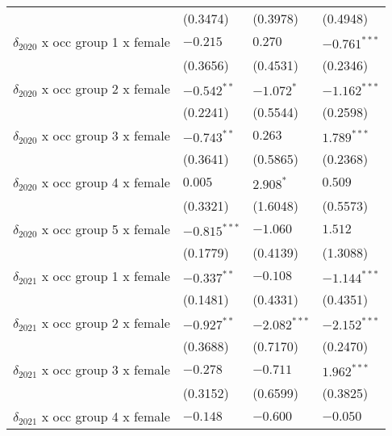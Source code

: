 \begin{tabular}{llll}
                                         &           (0.3474) &           (0.3978) &           (0.4948) \\
$\delta_{2020}$ x occ group 1 x female   &           $-0.215$ &            $0.270$ &     $-0.761^{***}$ \\
                                         &           (0.3656) &           (0.4531) &           (0.2346) \\
$\delta_{2020}$ x occ group 2 x female   &      $-0.542^{**}$ &         $-1.072^*$ &     $-1.162^{***}$ \\
                                         &           (0.2241) &           (0.5544) &           (0.2598) \\
$\delta_{2020}$ x occ group 3 x female   &      $-0.743^{**}$ &            $0.263$ &      $1.789^{***}$ \\
                                         &           (0.3641) &           (0.5865) &           (0.2368) \\
$\delta_{2020}$ x occ group 4 x female   &            $0.005$ &          $2.908^*$ &            $0.509$ \\
                                         &           (0.3321) &           (1.6048) &           (0.5573) \\
$\delta_{2020}$ x occ group 5 x female   &     $-0.815^{***}$ &           $-1.060$ &            $1.512$ \\
                                         &           (0.1779) &           (0.4139) &           (1.3088) \\
$\delta_{2021}$ x occ group 1 x female   &      $-0.337^{**}$ &           $-0.108$ &     $-1.144^{***}$ \\
                                         &           (0.1481) &           (0.4331) &           (0.4351) \\
$\delta_{2021}$ x occ group 2 x female   &      $-0.927^{**}$ &     $-2.082^{***}$ &     $-2.152^{***}$ \\
                                         &           (0.3688) &           (0.7170) &           (0.2470) \\
$\delta_{2021}$ x occ group 3 x female   &           $-0.278$ &           $-0.711$ &      $1.962^{***}$ \\
                                         &           (0.3152) &           (0.6599) &           (0.3825) \\
$\delta_{2021}$ x occ group 4 x female   &           $-0.148$ &           $-0.600$ &           $-0.050$ \\

\end{tabular}
